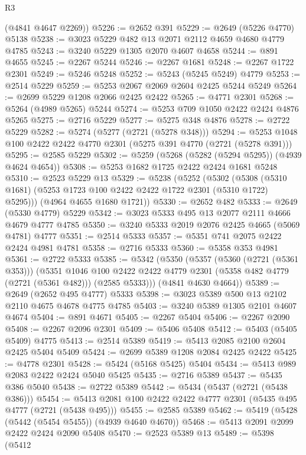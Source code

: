 \begin{lexlean}{R3}
\begin{coremodule}
      (@4841 @4647 @2269))
@5226 := @2652 @391
@5229 := @2649 (@5226 @4770) @5138
@5238 := @3023 @5229 @482 @13 @2071 @2112 @4659 @4680 @4779 @4785
@5243 := @3240 @5229 @1305 @2070 @4607 @4658
@5244 := @891 @4655
@5245 := @2267 @5244
@5246 := @2267 @1681
@5248 := @2267 @1722 @2301
@5249 := @5246 @5248
@5252 := @5243 (@5245 @5249) @4779
@5253 := @2514 @5229
@5259 := @5253 @2067 @2069 @2604 @2425 @5244 @5249
@5264 := @2699 @5229 @1208 @2066 @2425 @2422
@5265 := @4771 @2301
@5268 := @5264 (@4989 @5265) @5244
@5274 := @5253 @709 @1050 @2422 @2424 @4876 @5265
@5275 := @2716 @5229
@5277 := @5275 @348 @4876
@5278 := @2722 @5229
@5282 := @5274 (@5277 (@2721 (@5278 @348)))
@5294 := @5253 @1048 @100 @2422 @2422 @4770 @2301 (@5275 @391 @4770 (@2721 (@5278 @391)))
@5295 := @2585 @5229
@5302 := @5259 (@5268 (@5282 (@5294 @5295)) (@4939 @4624 @4654))
@5308 := @5253 @1682 @1725 @2422 @2424 @1681 @5248
@5310 := @2523 @5229 @13
@5329 := @5238
    (@5252
      (@5302 (@5308 (@5310 @1681) (@5253 @1723 @100 @2422 @2422 @1722 @2301 (@5310 @1722) @5295)))
      (@4964 @4655 @1680 @1721))
@5330 := @2652 @482
@5333 := @2649 (@5330 @4779) @5229
@5342 := @3023 @5333 @495 @13 @2077 @2111 @4666 @4679 @4777 @4785
@5350 := @3240 @5333 @2019 @2076 @2425 @4665 (@5069 @4781) @4777
@5351 := @2514 @5333
@5357 := @5351 @741 @2075 @2422 @2424 @4981 @4781
@5358 := @2716 @5333
@5360 := @5358 @353 @4981
@5361 := @2722 @5333
@5385 := @5342
    (@5350
      (@5357
        (@5360 (@2721 (@5361 @353)))
        (@5351
          @1046
          @100
          @2422
          @2422
          @4779
          @2301
          (@5358 @482 @4779 (@2721 (@5361 @482)))
          (@2585 @5333)))
      (@4841 @4630 @4664))
@5389 := @2649 (@2652 @495 @4777) @5333
@5398 := @3023 @5389 @500 @13 @2102 @2110 @4675 @4678 @4775 @4785
@5403 := @3240 @5389 @1305 @2101 @4607 @4674
@5404 := @891 @4671
@5405 := @2267 @5404
@5406 := @2267 @2090
@5408 := @2267 @2096 @2301
@5409 := @5406 @5408
@5412 := @5403 (@5405 @5409) @4775
@5413 := @2514 @5389
@5419 := @5413 @2085 @2100 @2604 @2425 @5404 @5409
@5424 := @2699 @5389 @1208 @2084 @2425 @2422
@5425 := @4778 @2301
@5428 := @5424 (@5168 @5425) @5404
@5434 := @5413 @989 @2083 @2422 @2424 @5040 @5425
@5435 := @2716 @5389
@5437 := @5435 @386 @5040
@5438 := @2722 @5389
@5442 := @5434 (@5437 (@2721 (@5438 @386)))
@5454 := @5413 @2081 @100 @2422 @2422 @4777 @2301 (@5435 @495 @4777 (@2721 (@5438 @495)))
@5455 := @2585 @5389
@5462 := @5419 (@5428 (@5442 (@5454 @5455)) (@4939 @4640 @4670))
@5468 := @5413 @2091 @2099 @2422 @2424 @2090 @5408
@5470 := @2523 @5389 @13
@5489 := @5398
    (@5412

\end{coremodule}
\end{lexlean}
